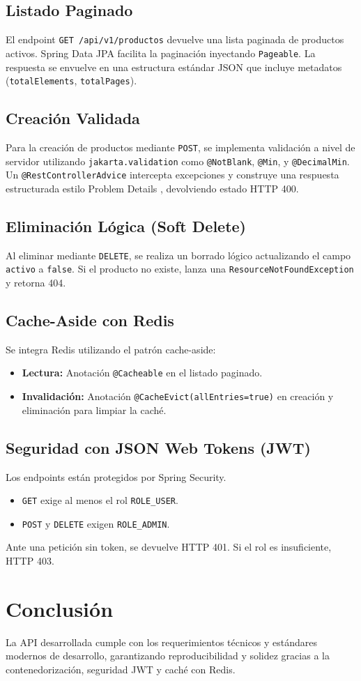\documentclass[12pt]{article}
\begin{document}
\subsection{Listado Paginado}
El endpoint \texttt{GET /api/v1/productos} devuelve una lista paginada de productos activos. Spring Data JPA facilita la paginación inyectando \texttt{Pageable}. La respuesta se envuelve en una estructura estándar JSON que incluye metadatos (\texttt{totalElements}, \texttt{totalPages}).

\subsection{Creación Validada}
Para la creación de productos mediante \texttt{POST}, se implementa validación a nivel de servidor utilizando \texttt{jakarta.validation} como \texttt{@NotBlank}, \texttt{@Min}, y \texttt{@DecimalMin}. 
Un \texttt{@RestControllerAdvice} intercepta excepciones y construye una respuesta estructurada estilo Problem Details \cite{problemdetails}, devolviendo estado HTTP 400.

\subsection{Eliminación Lógica (Soft Delete)}
Al eliminar mediante \texttt{DELETE}, se realiza un borrado lógico actualizando el campo \texttt{activo} a \texttt{false}. Si el producto no existe, lanza una \texttt{ResourceNotFoundException} y retorna 404.

\subsection{Cache-Aside con Redis}
Se integra Redis utilizando el patrón cache-aside:
\begin{itemize}
    \item \textbf{Lectura:} Anotación \texttt{@Cacheable} en el listado paginado. 
    \item \textbf{Invalidación:} Anotación \texttt{@CacheEvict(allEntries=true)} en creación y eliminación para limpiar la caché.
\end{itemize}

\subsection{Seguridad con JSON Web Tokens (JWT)}
Los endpoints están protegidos por Spring Security.
\begin{itemize}
    \item \texttt{GET} exige al menos el rol \texttt{ROLE\_USER}.
    \item \texttt{POST} y \texttt{DELETE} exigen \texttt{ROLE\_ADMIN}.
\end{itemize}
Ante una petición sin token, se devuelve HTTP 401. Si el rol es insuficiente, HTTP 403.

\section{Conclusión}
La API desarrollada cumple con los requerimientos técnicos y estándares modernos de desarrollo, garantizando reproducibilidad y solidez gracias a la contenedorización, seguridad JWT y caché con Redis.



\end{document}
